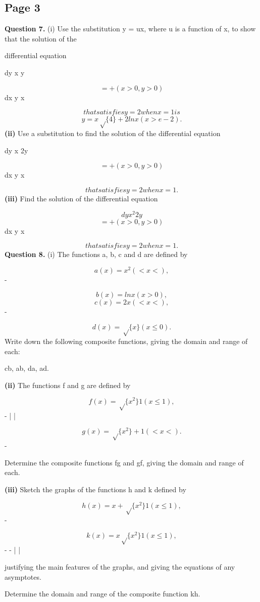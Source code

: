 \documentclass[12pt]{article}
\begin{document}
\subsection*{Page 3}
\begin{flushleft}
\bigskip\textbf{Question 7.} (i) Use the substitution y = ux, where u is a function of x, to show that the solution of the\par
differential equation\par
dy x y\par
\[= + (x > 0, y > 0)\]
dx y x\par
\[that satisfies y = 2 when x = 1 is\]
\[y = x \sqrt\{4\} + 2 ln x (x > e -2 ).\]
\textbf{(ii)} Use a substitution to find the solution of the differential equation\par
dy x 2y\par
\[= + (x > 0, y > 0)\]
dx y x\par
\[that satisfies y = 2 when x = 1.\]
\textbf{(iii)} Find the solution of the differential equation\par
\[dy x^2 2y\]
\[= + (x > 0, y > 0)\]
dx y x\par
\[that satisfies y = 2 when x = 1.\]
\bigskip\textbf{Question 8.} (i) The functions a, b, c and d are defined by\par
\[a(x) = x^2 ( < x < ),\]
-\infty \infty\par
\[b(x) = ln x (x > 0),\]
\[c(x) = 2x ( < x < ),\]
-\infty \infty\par
\[d(x) = \sqrt\{x\} (x \leq 0) .\]
Write down the following composite functions, giving the domain and range of each:\par
cb, ab, da, ad.\par
\textbf{(ii)} The functions f and g are defined by\par
\[f(x) = \sqrt\{x^2\} 1 ( x \leq 1),\]
- | |\par
\[g(x) = \sqrt\{x^2\} + 1 ( < x < ).\]
-\infty \infty\par
Determine the composite functions fg and gf, giving the domain and range of each.\par
\textbf{(iii)} Sketch the graphs of the functions h and k defined by\par
\[h(x) = x + \sqrt\{x^2\} 1 (x \leq 1),\]
-\par
\[k(x) = x \sqrt\{x^2\} 1 ( x \leq 1),\]
- - | |\par
justifying the main features of the graphs, and giving the equations of any asymptotes.\par
Determine the domain and range of the composite function kh.\par
\end{flushleft}
\end{document}
